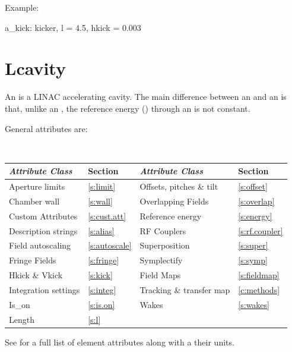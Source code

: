 Example:
\begin{example}
  a_kick: kicker, l = 4.5, hkick = 0.003
\end{example}

\section{Lcavity}
\label{s:lcav}

An  is a LINAC accelerating cavity.  The main difference between an
 and an  is that, unlike an , the reference energy
() through an  is not constant.

General  attributes are:
\begin{center}
\tt
\begin{tabular}{llll} \toprule
  {\sl Attribute Class}      & Section           & {\sl Attribute Class}      & Section            \\ \midrule
  Aperture limits            & \ref{s:limit}     & Offsets, pitches \& tilt   & \ref{s:offset}     \\
  Chamber wall               & \ref{s:wall}      & Overlapping Fields         & \ref{s:overlap}    \\
  Custom Attributes          & \ref{s:cust.att}  & Reference energy           & \ref{s:energy}     \\ 
  Description strings        & \ref{s:alias}     & RF Couplers                & \ref{s:rf.coupler} \\
  Field autoscaling          & \ref{s:autoscale} & Superposition              & \ref{s:super}      \\
  Fringe Fields              & \ref{s:fringe}    & Symplectify                & \ref{s:symp}       \\
  Hkick \& Vkick             & \ref{s:kick}      & Field Maps                 & \ref{s:fieldmap}   \\
  Integration settings       & \ref{s:integ}     & Tracking \& transfer map   & \ref{c:methods}    \\
  Is_on                      & \ref{s:is.on}     & Wakes                      & \ref{s:wakes}      \\
  Length                     & \ref{s:l}         &                            &                    \\
  \bottomrule
\end{tabular}
\end{center}
\toffset
See  for a full list of element attributes along with a their units.


